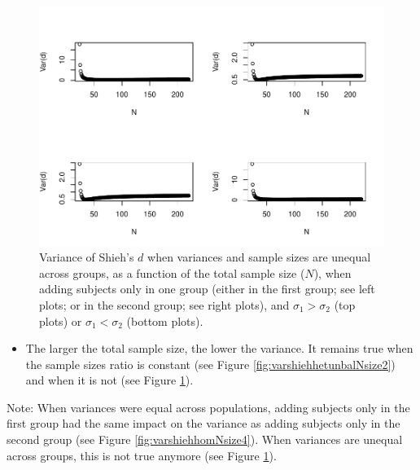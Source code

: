 \documentclass[
  english,
  man,mask]{apa6}
\providecommand{\tightlist}{%
  \setlength{\itemsep}{0pt}\setlength{\parskip}{0pt}}
\begin{document}
\begin{figure}
\centering
\includegraphics{Theoretical-Bias-of-all-estimators-as-a-function-of-population-parameters_files/figure-latex/varshiehhetunbalNsize4-1.pdf}
\caption{\label{fig:varshiehhetunbalNsize4}Variance of Shieh's \(d\) when variances and sample sizes are unequal across groups, as a function of the total sample size (\(N\)), when adding subjects only in one group (either in the first group; see left plots; or in the second group; see right plots), and \(\sigma_1 > \sigma_2\) (top plots) or \(\sigma_1 < \sigma_2\) (bottom plots).}
\end{figure}

\begin{itemize}
\tightlist
\item
  The larger the total sample size, the lower the variance. It remains true when the sample sizes ratio is constant (see Figure \ref{fig:varshiehhetunbalNsize2}) and when it is not (see Figure \ref{fig:varshiehhetunbalNsize4}).
\end{itemize}

Note: When variances were equal across populations, adding subjects only in the first group had the same impact on the variance as adding subjects only in the second group (see Figure \ref{fig:varshiehhomNsize4}). When variances are unequal across groups, this is not true anymore (see Figure \ref{fig:varshiehhetunbalNsize4}).
\end{document}
